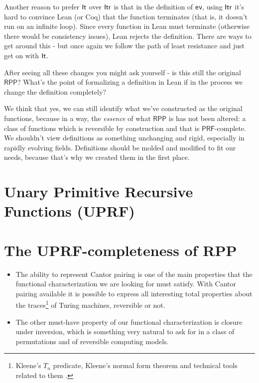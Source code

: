 \documentclass[runningheads]{llncs}
\newcommand{\RPP}{\textsf{RPP}\xspace}
\newcommand{\UPRF}{\textsf{UPRF}\xspace}
\newcommand{\PRF}{\textsf{PRF}\xspace}
\begin{document}
\begin{itemize}
    Another reason to prefer $\mathsf{It}$ over $\mathsf{Itr}$ is that in the definition of \lstinline{ev},
    using $\mathsf{Itr}$ it's hard to convince Lean (or Coq) that the function terminates (that is, it doesn't run on an infinite loop).
    Since every function in Lean must terminate (otherwise there would be consistency issues), Lean rejects the definition.
    There are ways to get around this - but once again we follow the path of least resistance and just get on with $\mathsf{It}$.
\end{itemize}

After seeing all these changes you might ask yourself - is this still the original $\RPP$?
What's the point of formalizing a definition in Lean if in the process we change the definition completely?

We think that yes, we can still identify what we've constructed as the original functions,
because in a way, the \textit{essence} of what $\RPP$ is has not been altered:
a class of functions which is reversible by construction and that is $\PRF$-complete.
We shouldn't view definitions as something unchanging and rigid, especially in rapidly evolving fields.
Definitions should be molded and modified to fit our needs,
because that's why we created them in the first place.





\section{Unary Primitive Recursive Functions (\UPRF) }
\label{section:Unary Primitive Recursive Functions}

\section{The \UPRF-completeness of \RPP}
\label{section:The UPRF-completeness of RPP}

\begin{itemize}
    \item
The ability to represent Cantor pairing \cite{rosenberg2009book} is one of the main properties that
the functional characterization we are looking for must satisfy.
With Cantor pairing available it is possible to express all interesting total properties about the
traces\footnote{Kleene's $T_n$ predicate, Kleene's normal form theorem and technical tools related to them \cite{cutland1980book,odifreddi1989book,soare1987book}.}
of Turing machines, reversible or not.
\item
The other must-have property of our functional characterization is closure under inversion, which is something
very natural to ask for in a class of permutations and of reversible computing models.
\end{itemize}
\end{document}
